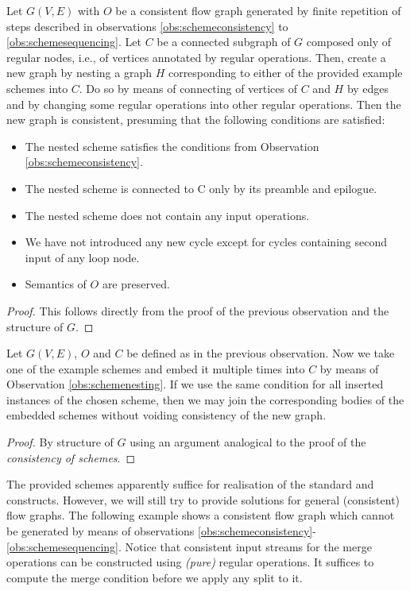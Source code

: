   Let $G(V,E)$ with $O$ be a consistent flow graph generated by finite repetition of steps described in observations \ref{obs:schemeconsistency} to \ref{obs:schemesequencing}. Let $C$ be a connected subgraph of $G$ composed only of regular nodes, i.e., of vertices annotated by regular operations. Then, create a new graph by nesting a graph $H$ corresponding to either of the provided example schemes into $C$. Do so by means of connecting of vertices of $C$ and $H$ by edges and by changing some regular operations into other regular operations. Then the new graph is consistent, presuming that the following conditions are satisfied:
  \begin{itemize}
    \item The nested scheme satisfies the conditions from Observation \ref{obs:schemeconsistency}.
    \item The nested scheme is connected to C only by its preamble and epilogue.
    \item The nested scheme does not contain any input operations. 
    \item We have not introduced any new cycle except for cycles containing second input of any loop node.
    \item Semantics of $O$ are preserved.
  \end{itemize}
  \begin{proof} 
    This follows directly from the proof of the previous observation and the structure of $G$.
  \end{proof}
\myendobs

  Let $G(V,E)$, $O$ and $C$ be defined as in the previous observation. Now we take one of the example schemes and embed it multiple times into $C$ by means of Observation \ref{obs:schemenesting}. If we use the same condition for all inserted instances of the chosen scheme, then we may join the corresponding bodies of the embedded schemes without voiding consistency of the new graph.
  \begin{proof} 
    By structure of $G$ using an argument analogical to the proof of the \emph{consistency of schemes}.
  \end{proof}
\myendobs


The provided schemes apparently suffice for realisation of the standard  and  constructs. However, we will still try to provide solutions for general (consistent) flow graphs. The following example shows a consistent flow graph which cannot be generated by means of observations \ref{obs:schemeconsistency}-\ref{obs:schemesequencing}. Notice that consistent input streams for the merge operations can be constructed using \emph{(pure)} regular operations. It suffices to compute the merge condition before we apply any split to it.

